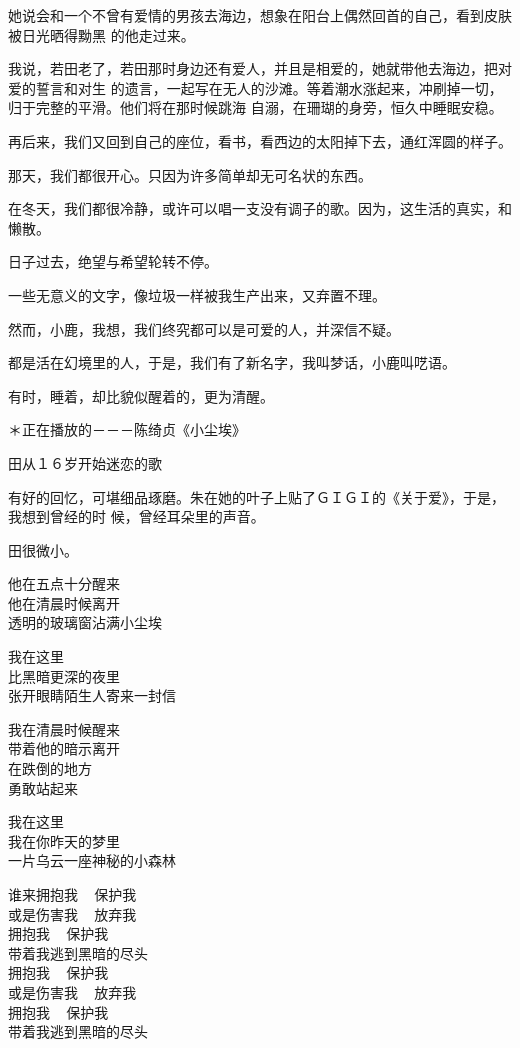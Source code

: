 \documentclass[12pt,a4paper]{article}
\def\blankrev{\vspace{1ex}}									%
\begin{document}
		她说会和一个不曾有爱情的男孩去海边，想象在阳台上偶然回首的自己，看到皮肤被日光晒得黝黑
	的他走过来。

		我说，若田老了，若田那时身边还有爱人，并且是相爱的，她就带他去海边，把对爱的誓言和对生
	的遗言，一起写在无人的沙滩。等着潮水涨起来，冲刷掉一切，归于完整的平滑。他们将在那时候跳海
	自溺，在珊瑚的身旁，恒久中睡眠安稳。

		再后来，我们又回到自己的座位，看书，看西边的太阳掉下去，通红浑圆的样子。\par
		那天，我们都很开心。只因为许多简单却无可名状的东西。

		在冬天，我们都很冷静，或许可以唱一支没有调子的歌。因为，这生活的真实，和懒散。\par
		日子过去，绝望与希望轮转不停。\par
		一些无意义的文字，像垃圾一样被我生产出来，又弃置不理。

		然而，小鹿，我想，我们终究都可以是可爱的人，并深信不疑。\par
		都是活在幻境里的人，于是，我们有了新名字，我叫梦话，小鹿叫呓语。

		有时，睡着，却比貌似醒着的，更为清醒。


		\blankrev

		＊正在播放的－－－陈绮贞《小尘埃》

		田从１６岁开始迷恋的歌

		有好的回忆，可堪细品琢磨。朱在她的叶子上贴了ＧＩＧＩ的《关于爱》，于是，我想到曾经的时
	候，曾经耳朵里的声音。

		田很微小。


		\longpoem{}{}{}
		他在五点十分醒来 \\
		他在清晨时候离开 \\
		透明的玻璃窗沾满小尘埃

		我在这里 \\
		比黑暗更深的夜里 \\
		张开眼睛陌生人寄来一封信

		我在清晨时候醒来 \\
		带着他的暗示离开 \\
		在跌倒的地方 \\
		勇敢站起来

		我在这里 \\
		我在你昨天的梦里 \\
		一片乌云一座神秘的小森林

		谁来拥抱我 ~ 保护我 \\
		或是伤害我 ~ 放弃我 \\
		拥抱我 ~ 保护我 \\
		带着我逃到黑暗的尽头 \\
		拥抱我 ~ 保护我 \\
		或是伤害我 ~ 放弃我 \\
		拥抱我 ~ 保护我 \\
		带着我逃到黑暗的尽头
\end{document}
